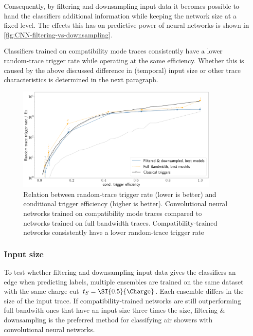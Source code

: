 Consequently, by filtering and downsampling input data it becomes possible to hand the classifiers additional information while keeping the network size at a fixed
level. The effects this has on predictive power of neural networks is shown in \autoref{fig:CNN-filtering-vs-downsampling}.

Classifiers trained on compatibility mode traces consistently have a lower random-trace trigger rate while operating at the same efficiency. Whether this is caused
by the above discussed difference in (temporal) input size or other trace characteristics is determined in the next paragraph.

\begin{figure}
	\centering
	\includegraphics[width=0.9\textwidth]{./plots/full_bandwidth_vs_filtering.png}
	\caption{Relation between random-trace trigger rate (lower is better) and conditional trigger efficiency (higher is better). Convolutional neural networks 
	trained on compatibility mode traces compared to networks trained on full bandwidth traces. Compatibility-trained networks consistently have a lower random-trace 
	trigger rate}
	\label{fig:CNN-filtering-vs-downsampling}
\end{figure}

\subsubsection{Input size}
\label{sssec:input-size}

To test whether filtering and downsampling input data gives the classifiers an edge when predicting labels, multiple ensembles are trained on the same dataset with 
the same charge cut $t_S = \SI{0.5}{\Charge}$. Each ensemble differs in the size of the input trace. If compatibility-trained networks are still outperforming full 
bandwith ones that have an input size three times the size, filtering \& downsampling is the preferred method for classifying air showers with convolutional neural
networks.

